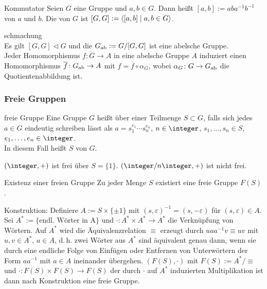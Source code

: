 \linie

\begin{Def}{Kommutator}
    Seien $G$ eine Gruppe und $a, b \in G$.
    Dann heißt $[a, b] := aba^{-1}b^{-1}$  von $a$ und $b$.
    Die  von $G$ ist
    $[G, G] := \left\langle{[a, b] \;|\; a, b \in G}\right\rangle$.
\end{Def}

\begin{Satz}{schmachung}\\
    Es gilt $[G, G] \vartriangleleft G$ und
    die  $G_{\text{ab}} := G/[G, G]$ ist eine
    abelsche Gruppe. \\
    Jeder Homomorphismus $f\colon G \rightarrow A$ in eine
    abelsche Gruppe $A$ induziert einen Homomorphismus
    $\overline{f}\colon G_{\text{ab}} \rightarrow A$ mit
    $f = \overline{f} \circ \alpha_G$, wobei
    $\alpha_G\colon G \rightarrow G_{\text{ab}}$ die Quotientenabbildung ist.
\end{Satz}

\subsubsection{%
    Freie Gruppen%
}

\begin{Def}{freie Gruppe}
    Eine Gruppe $G$ heißt  über einer Teilmenge $S \subset G$,
    falls sich jedes $a \in G$ eindeutig schreiben lässt als
    $a = s_1^{e_1} \dotsm s_n^{e_n}$, $n \in \integer$,
    $s_1, \dotsc, s_n \in S$, $e_1, \dotsc, e_n \in \integer$. \\
    In diesem Fall heißt $S$  von $G$.
\end{Def}

\begin{Bsp}
    $(\integer, +)$ ist frei über $S = \{1\}$.
    $(\integer/n\integer, +)$ ist nicht frei.
\end{Bsp}

\begin{Satz}{Existenz einer freien Gruppe}
    Zu jeder Menge $S$ existiert eine freie Gruppe $F(S)$.
\end{Satz}

\begin{Bem}
    Konstruktion:
    Definiere $A := S \times \{\pm 1\}$ mit
    $(s, \varepsilon)^{-1} = (s, -\varepsilon)$ für $(s, \varepsilon) \in A$.
    Sei $A^\ast := \{\text{endl. Wörter in A}\}$ und
    $\cdot\colon A^\ast \times A^\ast \rightarrow A^\ast$ die Verknüpfung
    von Wörtern.
    Auf $A^\ast$ wird die Äquivalenzrelation $\equiv$ erzeugt durch
    $uaa^{-1}v \equiv uv$ mit $u, v \in A^\ast$, $a \in A$, d.\,h. zwei
    Wörter aus $A^\ast$ sind äquivalent genau dann, wenn sie durch eine
    endliche Folge von Einfügen oder Entfernen von Unterwörtern der Form
    $aa^{-1}$ mit $a \in A$ ineinander übergehen.
    $(F(S), \cdot)$ mit $F(S) := A^\ast/\equiv$ und
    $\cdot\colon F(S) \times F(S) \rightarrow F(S)$
    der durch $\cdot$ auf $A^\ast$ induzierten Multiplikation ist dann
    nach Konstruktion eine freie Gruppe.
\end{Bem}

